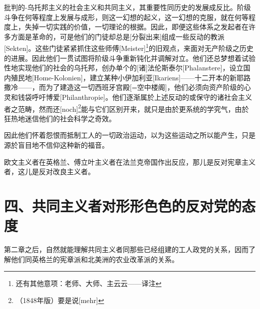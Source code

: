 \documentclass[a4paper,12pt]{ctexart}
\begin{document}
批判的-乌托邦主义的社会主义和共同主义，其重要性同历史的发展成反比。阶级斗争在何等程度上发展与成形，则这一幻想的起义，这一幻想的克服，就在何等程度上，失掉一切实践的价值，一切理论的根据。因此，即便这些体系之发起者在许多方面是革命的，可是他们的门徒却总是[分裂出来]组成一些反动的教派[Sekten]。这些门徒紧紧抓住这些师傅[Meister]\footnote{还有其他意项：老师、大师、主云云——译注}的旧观点，来面对无产阶级之历史的进展。因此他们一贯试图将阶级斗争重新钝化并调解对立。他们还总梦想着试验性地实现他们的社会的乌托邦，创办单个的[诸]法伦斯泰尔[Phalanstere]，设立国内殖民地[Home-Kolonien]，建立某种小伊加利亚[Ikariens]——十二开本的新耶路撒冷——，而为了建造这一切西班牙宫殿[=空中楼阁]，他们必须向资产阶级的心灵和钱袋呼吁博爱[Philanthropie]。他们逐渐属於上述反动的或保守的诸社会主义者之范畴，然而还[noch]\footnote{（1848年版）要是说[mehr]}能与它们区别开来，就只是由於更系统的学究气，由於狂热地迷信他们的社会科学之奇效。

因此他们怀着怨恨而抵制工人的一切政治运动，以为这些运动之所以能产生，只是源於盲目地不信仰这种新的福音。

欧文主义者在英格兰、傅立叶主义者在法兰克帝国作出反应，那儿是反对宪章主义者，这儿是反对改良主义者。


\section{四、共同主义者对形形色色的反对党的态度}

第二章之后，自然就能理解共同主义者同那些已经组建的工人政党的关系，因而了解他们同英格兰的宪章派和北美洲的农业改革派的关系。
\end{document}
